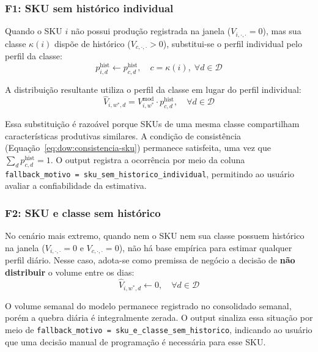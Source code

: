 \documentclass[11pt,a4paper]{article}
\begin{document}
\subsubsection{F1: SKU sem histórico individual}

Quando o SKU $i$ não possui produção registrada na janela ($V_{i,\cdot,\cdot}=0$),
mas sua classe $\kappa(i)$ dispõe de histórico ($V_{c,\cdot,\cdot}>0$),
substitui-se o perfil individual pelo perfil da classe:
\begin{equation}\label{eq:dow:fallback-f1}
p^{\text{hist}}_{i,d} \leftarrow p^{\text{hist}}_{c,d},
\quad c = \kappa(i),\;\forall d \in \mathcal{D}
\end{equation}

A distribuição resultante utiliza o perfil da classe em lugar do perfil
individual:
\begin{equation}\label{eq:dow:distribuicao-fallback-f1}
\hat{V}_{i,w^*,d} = V^{\text{mod}}_{i,w^*} \cdot p^{\text{hist}}_{c,d},
\quad \forall d \in \mathcal{D}
\end{equation}

Essa substituição é razoável porque SKUs de uma mesma classe compartilham
características produtivas similares. A condição de consistência
(Equação~\eqref{eq:dow:consistencia-sku}) permanece satisfeita, uma vez que
$\sum_d p^{\text{hist}}_{c,d} = 1$. O output registra a ocorrência por meio
da coluna \texttt{fallback\_motivo = sku\_sem\_historico\_individual},
permitindo ao usuário avaliar a confiabilidade da estimativa.

\subsubsection{F2: SKU e classe sem histórico}

No cenário mais extremo, quando nem o SKU nem sua classe possuem histórico na
janela ($V_{i,\cdot,\cdot}=0$ e $V_{c,\cdot,\cdot}=0$), não há base empírica
para estimar qualquer perfil diário. Nesse caso, adota-se como premissa de
negócio a decisão de \textbf{não distribuir} o volume entre os dias:
\begin{equation}\label{eq:dow:fallback-f2}
\hat{V}_{i,w^*,d} \leftarrow 0,
\quad \forall d \in \mathcal{D}
\end{equation}

O volume semanal do modelo permanece registrado no consolidado semanal, porém
a quebra diária é integralmente zerada. O output sinaliza essa situação
por meio de \texttt{fallback\_motivo = sku\_e\_classe\_sem\_historico},
indicando ao usuário que uma decisão manual de programação é necessária para
esse SKU.
\end{document}
